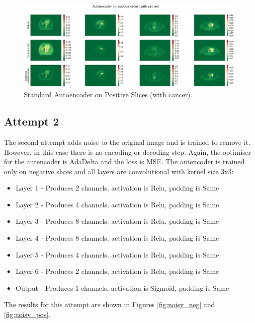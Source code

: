 \begin{figure}[hbtp!]
    \centering
    \includegraphics[width=\textwidth]{./img/standard_positive.png}
    \caption{Standard Autoencoder on Positive Slices (with cancer).}
    \label{fig:standard_pos}
\end{figure}

\subsection{Attempt 2}\label{subsec:attempt2}
The second attempt adds noise to the original image and is trained to remove it.
However, in this case there is no encoding or decoding step.
Again, the optimiser for the autencoder is AdaDelta and the loss is MSE.
The autencoder is trained only on negative slices and all layers are convolutional with kernel size 3x3:

\begin{itemize}
    \item Layer 1 - Produces 2 channels, activation is Relu, padding is Same
    \item Layer 2 - Produces 4 channels, activation is Relu, padding is Same
    \item Layer 3 - Produces 8 channels, activation is Relu, padding is Same
    \item Layer 4 - Produces 8 channels, activation is Relu, padding is Same
    \item Layer 5 - Produces 4 channels, activation is Relu, padding is Same
    \item Layer 6 - Produces 2 channels, activation is Relu, padding is Same
    \item Output - Produces 1 channels, activation is Sigmoid, padding is Same
\end{itemize}

The results for this attempt are shown in Figures \ref{fig:noisy_neg} and \ref{fig:noisy_pos}.

